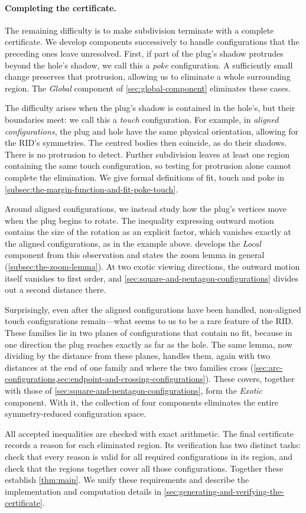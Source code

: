 \paragraph{Completing the certificate.}
The remaining difficulty is to make subdivision terminate with a complete
certificate. We develop components successively to handle configurations
that the preceding ones leave unresolved.
First, if part of the plug's shadow protrudes beyond the hole's shadow,
we call this a \emph{poke} configuration. A sufficiently small change
preserves that protrusion, allowing us to eliminate a whole surrounding
region. The \emph{Global} component of \cref{sec:global-component}
eliminates these cases.

The difficulty arises when the plug's shadow is contained in the hole's,
but their boundaries meet: we call this a \emph{touch} configuration.
For example, in \emph{aligned configurations}, the plug and hole have the
same physical orientation, allowing for the RID's symmetries. The centred
bodies then coincide, as do their shadows. There is no protrusion to detect.
Further subdivision leaves at least one region containing the same touch
configuration, so testing for protrusion alone cannot complete the elimination.
We give formal definitions of fit, touch and poke in
\cref{subsec:the-margin-function-and-fit-poke-touch}.

Around aligned configurations, we instead study how the plug's vertices
move when the plug begins to rotate. The inequality expressing outward
motion contains the size of the rotation as an explicit factor, which
vanishes exactly at the aligned configurations, as in the example above.
 develops the \emph{Local} component from this
observation and states the zoom lemma in general
(\cref{subsec:the-zoom-lemma}).
At two exotic viewing directions, the outward motion itself vanishes
to first order, and \cref{sec:square-and-pentagon-configurations} divides
out a second distance there.

Surprisingly, even after the aligned configurations have been
handled, non-aligned touch configurations remain---what
seems to us to be a rare feature of the RID\@. These families lie in two
planes of configurations that contain no fit, because in one direction the
plug reaches exactly as far as the hole. The same lemma, now dividing by
the distance from these planes, handles them, again with two distances at
the end of one family and where the two families cross
(\cref{sec:arc-configurations,sec:endpoint-and-crossing-configurations}).
These covers, together with those of
\cref{sec:square-and-pentagon-configurations}, form the \emph{Exotic}
component. With it, the collection of four components eliminates the
entire symmetry-reduced configuration space.

All accepted inequalities are checked with exact arithmetic. The final
certificate records a reason for each eliminated region. Its verification has
two distinct tasks: check that every reason is valid for all required
configurations in its region, and check that the regions together cover
all those configurations.
Together these establish \cref{thm:main}. We unify these requirements and
describe the implementation and computation details in
\cref{sec:generating-and-verifying-the-certificate}.
